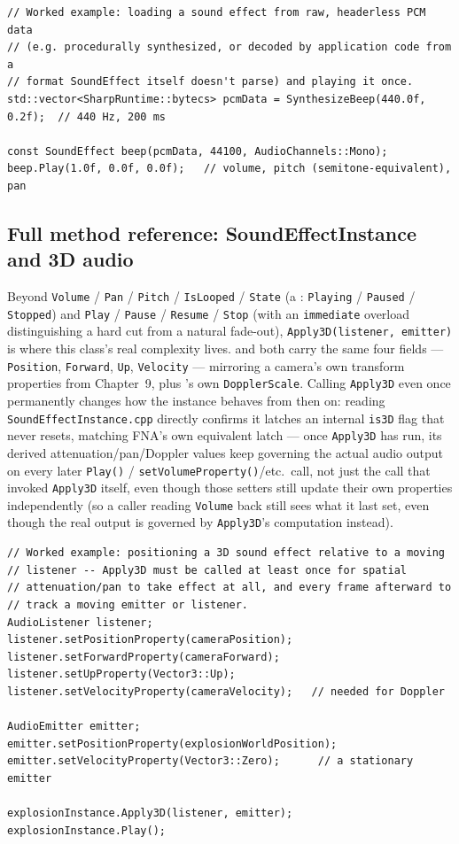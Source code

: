 \begin{lstlisting}
// Worked example: loading a sound effect from raw, headerless PCM data
// (e.g. procedurally synthesized, or decoded by application code from a
// format SoundEffect itself doesn't parse) and playing it once.
std::vector<SharpRuntime::bytecs> pcmData = SynthesizeBeep(440.0f, 0.2f);  // 440 Hz, 200 ms

const SoundEffect beep(pcmData, 44100, AudioChannels::Mono);
beep.Play(1.0f, 0.0f, 0.0f);   // volume, pitch (semitone-equivalent), pan
\end{lstlisting}

\subsection{Full method reference: SoundEffectInstance and 3D audio}

Beyond \texttt{Volume} / \texttt{Pan} / \texttt{Pitch} / \texttt{IsLooped} / \texttt{State} (a
: \texttt{Playing} / \texttt{Paused} / \texttt{Stopped}) and
\texttt{Play} / \texttt{Pause} / \texttt{Resume} / \texttt{Stop} (with an \texttt{immediate} overload
distinguishing a hard cut from a natural fade-out), \texttt{Apply3D(listener, emitter)} is
where this class's real complexity lives.  and 
both carry the same four  fields --- \texttt{Position}, \texttt{Forward},
\texttt{Up}, \texttt{Velocity} --- mirroring a camera's own transform properties from
Chapter~9, plus 's own \texttt{DopplerScale}. Calling \texttt{Apply3D}
even once permanently changes how the instance behaves from then on: reading
\texttt{SoundEffectInstance.cpp} directly confirms it latches an internal \texttt{is3D} flag
that never resets, matching FNA's own equivalent latch --- once \texttt{Apply3D} has run, its
derived attenuation/pan/Doppler values keep governing the actual audio output on every later
\texttt{Play()} / \texttt{setVolumeProperty()}/etc.\ call, not just the call that invoked
\texttt{Apply3D} itself, even though those setters still update their own properties
independently (so a caller reading \texttt{Volume} back still sees what it last set, even
though the real output is governed by \texttt{Apply3D}'s computation instead).

\begin{lstlisting}
// Worked example: positioning a 3D sound effect relative to a moving
// listener -- Apply3D must be called at least once for spatial
// attenuation/pan to take effect at all, and every frame afterward to
// track a moving emitter or listener.
AudioListener listener;
listener.setPositionProperty(cameraPosition);
listener.setForwardProperty(cameraForward);
listener.setUpProperty(Vector3::Up);
listener.setVelocityProperty(cameraVelocity);   // needed for Doppler

AudioEmitter emitter;
emitter.setPositionProperty(explosionWorldPosition);
emitter.setVelocityProperty(Vector3::Zero);      // a stationary emitter

explosionInstance.Apply3D(listener, emitter);
explosionInstance.Play();
\end{lstlisting}

